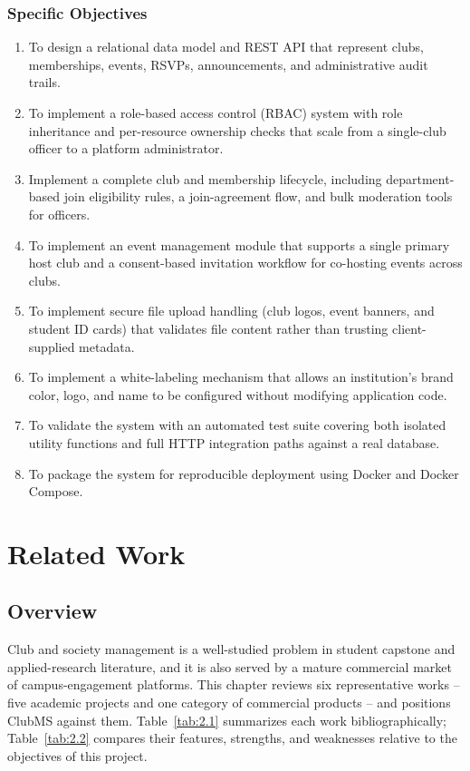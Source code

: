 \documentclass[12pt,oneside]{book}
\begin{document}
\subsection{Specific Objectives}
\begin{enumerate}
\item To design a relational data model and REST API that represent clubs, memberships, events, RSVPs, announcements, and administrative audit trails.
\item To implement a role-based access control (RBAC) system with role inheritance and per-resource ownership checks that scale from a single-club officer to a platform administrator.
\item Implement a complete club and membership lifecycle, including department-based join eligibility rules, a join-agreement flow, and bulk moderation tools for officers.
\item To implement an event management module that supports a single primary host club and a consent-based invitation workflow for co-hosting events across clubs.
\item To implement secure file upload handling (club logos, event banners, and student ID cards) that validates file content rather than trusting client-supplied metadata.
\item To implement a white-labeling mechanism that allows an institution's brand color, logo, and name to be configured without modifying application code.
\item To validate the system with an automated test suite covering both isolated utility functions and full HTTP integration paths against a real database.
\item To package the system for reproducible deployment using Docker and Docker Compose.
\end{enumerate}


\chapter{Related Work}

\section{Overview}

Club and society management is a well-studied problem in student capstone and applied-research literature, and it is also served by a mature commercial market of campus-engagement platforms. This chapter reviews six representative works -- five academic projects and one category of commercial products -- and positions ClubMS against them. Table~\ref{tab:2.1} summarizes each work bibliographically; Table~\ref{tab:2.2} compares their features, strengths, and weaknesses relative to the objectives of this project.
\end{document}
